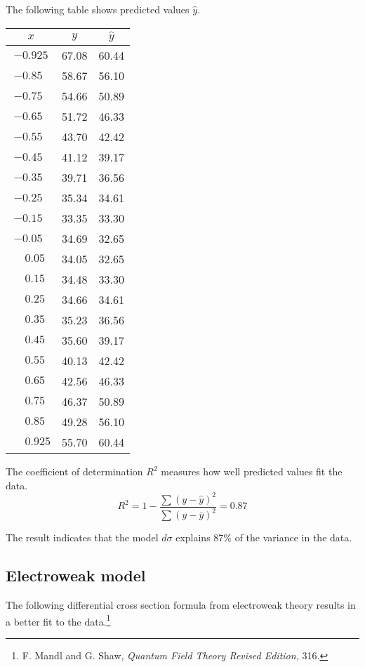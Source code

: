 \documentclass[12pt]{article}
\begin{document}
The following table shows predicted values $\hat{y}$.

\begin{center}
\begin{tabular}{|c|c|c|}
\hline
$x$ & $y$ & $\hat{y}$ \\
\hline
$-0.925$ & 67.08 & 60.44\\
$-0.85\phantom{0}$ & 58.67 & 56.10\\
$-0.75\phantom{0}$ & 54.66 & 50.89\\
$-0.65\phantom{0}$ & 51.72 & 46.33\\
$-0.55\phantom{0}$ & 43.70 & 42.42\\
$-0.45\phantom{0}$ & 41.12 & 39.17\\
$-0.35\phantom{0}$ & 39.71 & 36.56\\
$-0.25\phantom{0}$ & 35.34 & 34.61\\
$-0.15\phantom{0}$ & 33.35 & 33.30\\
$-0.05\phantom{0}$ & 34.69 & 32.65\\
$\phantom{+}0.05\phantom{0}$ & 34.05 & 32.65\\
$\phantom{+}0.15\phantom{0}$ & 34.48 & 33.30\\
$\phantom{+}0.25\phantom{0}$ & 34.66 & 34.61\\
$\phantom{+}0.35\phantom{0}$ & 35.23 & 36.56\\
$\phantom{+}0.45\phantom{0}$ & 35.60 & 39.17\\
$\phantom{+}0.55\phantom{0}$ & 40.13 & 42.42\\
$\phantom{+}0.65\phantom{0}$ & 42.56 & 46.33\\
$\phantom{+}0.75\phantom{0}$ & 46.37 & 50.89\\
$\phantom{+}0.85\phantom{0}$ & 49.28 & 56.10\\
$\phantom{+}0.925$ & 55.70 & 60.44\\
\hline
\end{tabular}
\end{center}

The coefficient of determination $R^2$ measures how well predicted values fit the data.
\begin{equation*}
R^2=1-\frac{\sum(y-\hat{y})^2}{\sum(y-\bar{y})^2}=0.87
\end{equation*}

The result indicates that the model $d\sigma$ explains 87\% of the variance in the data.

\subsection*{Electroweak model}
The following differential cross section formula from electroweak
theory results in a better fit to the
data.\footnote{F. Mandl and G. Shaw, {\it Quantum Field Theory Revised Edition,} 316.}
\end{document}

